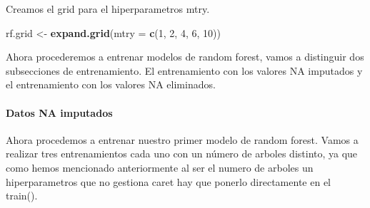 \documentclass[
]{article}
\newenvironment{Shaded}{\begin{snugshade}}{\end{snugshade}}
\newcommand{\AttributeTok}[1]{\textcolor[rgb]{0.13,0.29,0.53}{#1}}
\newcommand{\DecValTok}[1]{\textcolor[rgb]{0.00,0.00,0.81}{#1}}
\newcommand{\FunctionTok}[1]{\textcolor[rgb]{0.13,0.29,0.53}{\textbf{#1}}}
\newcommand{\NormalTok}[1]{#1}
\newcommand{\OtherTok}[1]{\textcolor[rgb]{0.56,0.35,0.01}{#1}}
\begin{document}
Creamos el grid para el hiperparametros mtry.

\begin{Shaded}
\begin{Highlighting}[]
\NormalTok{rf.grid }\OtherTok{\textless{}{-}} \FunctionTok{expand.grid}\NormalTok{(}\AttributeTok{mtry =} \FunctionTok{c}\NormalTok{(}\DecValTok{1}\NormalTok{, }\DecValTok{2}\NormalTok{, }\DecValTok{4}\NormalTok{, }\DecValTok{6}\NormalTok{, }\DecValTok{10}\NormalTok{))}
\end{Highlighting}
\end{Shaded}

Ahora procederemos a entrenar modelos de random forest, vamos a
distinguir dos subsecciones de entrenamiento. El entrenamiento con los
valores NA imputados y el entrenamiento con los valores NA eliminados.

\hypertarget{datos-na-imputados}{%
\paragraph{Datos NA imputados}\label{datos-na-imputados}}

Ahora procedemos a entrenar nuestro primer modelo de random forest.
Vamos a realizar tres entrenamientos cada uno con un número de arboles
distinto, ya que como hemos mencionado anteriormente al ser el numero de
arboles un hiperparametros que no gestiona caret hay que ponerlo
directamente en el train().
\end{document}
